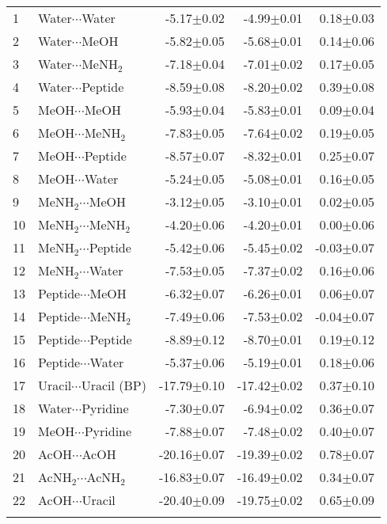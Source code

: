 \begin{longtable}{llrrr}
1 & Water$\cdots$Water & -5.17$\pm$0.02 & -4.99$\pm$0.01 & 0.18$\pm$0.03  \\
2 & Water$\cdots$MeOH & -5.82$\pm$0.05 & -5.68$\pm$0.01 & 0.14$\pm$0.06  \\
3 & Water$\cdots$MeNH$_2$ & -7.18$\pm$0.04 & -7.01$\pm$0.02 & 0.17$\pm$0.05  \\
4 & Water$\cdots$Peptide & -8.59$\pm$0.08 & -8.20$\pm$0.02 & 0.39$\pm$0.08  \\
5 & MeOH$\cdots$MeOH & -5.93$\pm$0.04 & -5.83$\pm$0.01 & 0.09$\pm$0.04  \\
6 & MeOH$\cdots$MeNH$_2$ & -7.83$\pm$0.05 & -7.64$\pm$0.02 & 0.19$\pm$0.05  \\
7 & MeOH$\cdots$Peptide & -8.57$\pm$0.07 & -8.32$\pm$0.01 & 0.25$\pm$0.07  \\
8 & MeOH$\cdots$Water & -5.24$\pm$0.05 & -5.08$\pm$0.01 & 0.16$\pm$0.05  \\
9 & MeNH$_2$$\cdots$MeOH & -3.12$\pm$0.05 & -3.10$\pm$0.01 & 0.02$\pm$0.05  \\
10 & MeNH$_2$$\cdots$MeNH$_2$ & -4.20$\pm$0.06 & -4.20$\pm$0.01 & 0.00$\pm$0.06  \\
11 & MeNH$_2$$\cdots$Peptide & -5.42$\pm$0.06 & -5.45$\pm$0.02 & -0.03$\pm$0.07  \\
12 & MeNH$_2$$\cdots$Water & -7.53$\pm$0.05 & -7.37$\pm$0.02 & 0.16$\pm$0.06  \\
13 & Peptide$\cdots$MeOH & -6.32$\pm$0.07 & -6.26$\pm$0.01 & 0.06$\pm$0.07  \\
14 & Peptide$\cdots$MeNH$_2$ & -7.49$\pm$0.06 & -7.53$\pm$0.02 & -0.04$\pm$0.07  \\
15 & Peptide$\cdots$Peptide & -8.89$\pm$0.12 & -8.70$\pm$0.01 & 0.19$\pm$0.12  \\
16 & Peptide$\cdots$Water & -5.37$\pm$0.06 & -5.19$\pm$0.01 & 0.18$\pm$0.06  \\
17 & Uracil$\cdots$Uracil (BP) & -17.79$\pm$0.10 & -17.42$\pm$0.02 & 0.37$\pm$0.10  \\
18 & Water$\cdots$Pyridine & -7.30$\pm$0.07 & -6.94$\pm$0.02 & 0.36$\pm$0.07  \\
19 & MeOH$\cdots$Pyridine & -7.88$\pm$0.07 & -7.48$\pm$0.02 & 0.40$\pm$0.07  \\
20 & AcOH$\cdots$AcOH & -20.16$\pm$0.07 & -19.39$\pm$0.02 & 0.78$\pm$0.07  \\
21 & AcNH$_2$$\cdots$AcNH$_2$ & -16.83$\pm$0.07 & -16.49$\pm$0.02 & 0.34$\pm$0.07  \\
22 & AcOH$\cdots$Uracil & -20.40$\pm$0.09 & -19.75$\pm$0.02 & 0.65$\pm$0.09  \\
$$
\end{longtable}
